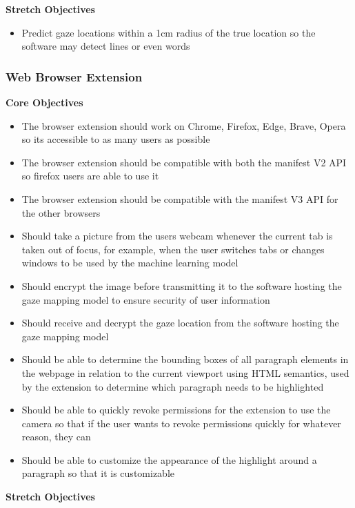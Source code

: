 \documentclass[twocolumn]{report}
\begin{document}
\textbf{Stretch Objectives}

\begin{itemize}
    \item Predict gaze locations within a 1cm radius of the true location so the software may detect lines or even words
\end{itemize}

\subsubsection{Web Browser Extension}

\textbf{Core Objectives}

\begin{itemize}
    \item The browser extension should work on Chrome, Firefox, Edge, Brave, Opera so its accessible to as many users as possible 
    \item The browser extension should be compatible with both the manifest V2 API so firefox users are able to use it 
    \item The browser extension should be compatible with the manifest V3 API for the other browsers 
    \item Should take a picture from the users webcam whenever the current tab is taken out of focus, for example, when the user switches tabs or changes windows to be used by the machine learning model 
    \item Should encrypt the image before transmitting it to the software hosting the gaze mapping model to ensure security of user information 
    \item Should receive and decrypt the gaze location from the software hosting the gaze mapping model 
    \item Should be able to determine the bounding boxes of all paragraph elements in the webpage in relation to the current viewport using HTML semantics, used by the extension to determine which paragraph needs to be highlighted 
    \item Should be able to quickly revoke permissions for the extension to use the camera so that if the user wants to revoke permissions quickly for whatever reason, they can 
    \item Should be able to customize the appearance of the highlight around a paragraph so that it is customizable 
\end{itemize}

\textbf{Stretch Objectives}
\end{document}
